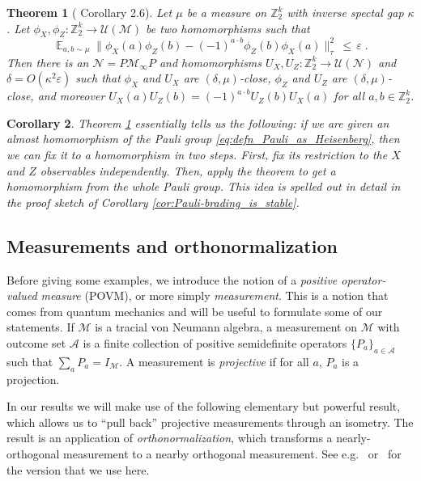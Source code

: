 \documentclass[11pt]{article}
\newtheorem{theorem}{Theorem}[section]
\newtheorem{corollary}[theorem]{Corollary}
\theoremstyle{definition}
\newcommand{\Id}{\ensuremath{I}}
\DeclareMathOperator*{\Expectation}{\mathbb{E}}
\newcommand{\Es}[1]{\Expectation_{#1}}
\newcommand{\Z}{\ensuremath{\mathbb{Z}}}
\newcommand{\mA}{\ensuremath{\mathcal{A}}}
\newcommand{\mM}{\ensuremath{\mathcal{M}}}
\newcommand{\mU}{\ensuremath{\mathcal{U}}}
\newcommand{\eps}{\varepsilon}
\newcommand{\mN}{\mathcal{N}}
\begin{document}
\begin{theorem}[\cite{de2022spectral} Corollary 2.6]\label{thm:dls-gap}
Let $\mu$ be a measure on $\Z_2^k$ with inverse spectal gap $\kappa$. Let $\phi_X,\phi_Z: \Z_2^k \to \mU(\mM)$ be two homomorphisms such that
\[ \Es{a,b\sim \mu} \big\| \phi_X(a)\phi_Z(b)-(-1)^{a\cdot b} \phi_Z(b)\phi_X(a)\big\|_\tau^2 \,\leq\,\eps\;.\]
Then there is an $\mN=P\mM_\infty P$ and homomorphisms $U_X,U_Z:\Z_2^k\to\mU(\mN)$ and $\delta=O(\kappa^2\eps)$ such that $\phi_X$ and $U_X$ are $(\delta,\mu)$-close, $\phi_Z$ and $U_Z$ are $(\delta,\mu)$-close, and moreover $U_X(a)U_Z(b)=(-1)^{a\cdot b}U_Z(b)U_X(a)$ for all $a,b\in\Z_2^k$.
\end{theorem}
\begin{corollary}
    Theorem \ref{thm:dls-gap} essentially tells us the following: if we are given an almost homomorphism of the Pauli group \eqref{eq:defn_Pauli_as_Heisenberg}, then we can fix it to a homomorphism in two steps. First, fix its restriction to the $X$ and $Z$ observables independently. Then, apply the theorem to get a homomorphism from the whole Pauli group. This idea is spelled out in detail in the proof sketch of Corollary \ref{cor:Pauli-brading_is_stable}.
\end{corollary}



	\subsection{Measurements and orthonormalization}
	\label{sec:measurements}
	
	Before giving some examples, we introduce the notion of a \emph{positive operator-valued measure} (POVM), or more simply \emph{measurement}. This is a notion that comes from quantum mechanics and will be useful to formulate some of our statements.  
  If $\mM$ is a tracial von Neumann algebra, a measurement on $\mM$ with outcome set $\mA$ is a finite collection of positive semidefinite operators $\{P_a\}_{a\in \mA}$ such that $\sum_a P_a = \Id_\mM$. A measurement is \emph{projective} if for all $a$, $P_a$ is a projection. 
	
	In our results we will make use of the following elementary but powerful result, which allows us to ``pull back'' projective measurements through an isometry. The result is an application of \emph{orthonormalization}, which transforms a nearly-orthogonal measurement to a nearby orthogonal measurement. See e.g.~\cite{kempe2011parallel,ji2020quantum} or~\cite[Theorem 1.2]{de2021orthogonalization} for the version that we use here. 
	
\end{document}
